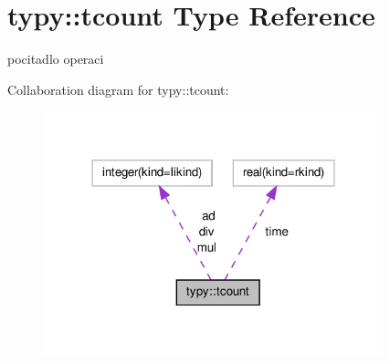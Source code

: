 \hypertarget{structtypy_1_1tcount}{\section{typy\-:\-:tcount \-Type \-Reference}
\label{structtypy_1_1tcount}
}


pocitadlo operaci  




\-Collaboration diagram for typy\-:\-:tcount\-:\nopagebreak
\begin{figure}[H]
\begin{center}
\leavevmode
\includegraphics[width=278pt]{structtypy_1_1tcount__coll__graph}
\end{center}
\end{figure}

